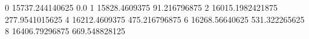 0 15737.244140625 0.0
1 15828.4609375 91.216796875
2 16015.1982421875 277.9541015625
4 16212.4609375 475.216796875
6 16268.56640625 531.322265625
8 16406.79296875 669.548828125
